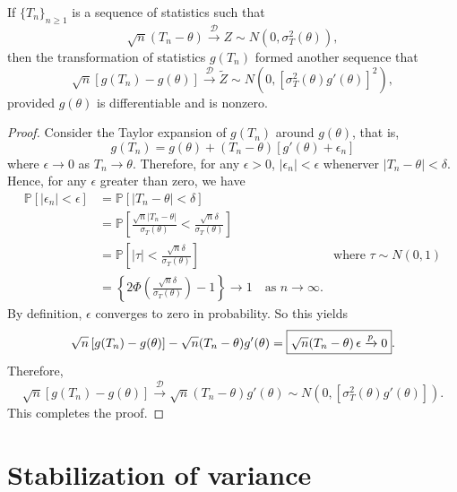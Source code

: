 \begin{lemma}
    \label{lem:las01}
    If $\{T_n\}_{n \geq 1}$ is a sequence of statistics such that 
    \begin{equation}
        \sqrt{n}(T_n - \theta) \xrightarrow[]{\mathcal{D}} Z \sim N\left(0, \sigma^2_T(\theta) \right),
    \end{equation}
    then the transformation of statistics $g(T_n)$ formed another sequence that
    \begin{equation}
        \sqrt{n}\left[ g(T_n) - g(\theta)\right] \xrightarrow[]{\mathcal{D}} \widetilde{Z} \sim N\left(0, \left[\sigma^2_T(\theta) g'(\theta) \right]^2 \right),
    \end{equation}
    provided $g(\theta)$ is differentiable and is nonzero.
\end{lemma}
\begin{proof}
    Consider the Taylor expansion of $g(T_n)$ around $g(\theta)$, that is,
    \[
        g(T_n) = g(\theta) + (T_n - \theta) [g'(\theta) + \epsilon_n]
    \]
    where $\epsilon \to 0$ as $T_n \to \theta$. Therefore, for any $\epsilon > 0$, $|\epsilon_n|<\epsilon$ whenerver 
    $|T_n - \theta| < \delta$. Hence, for any $\epsilon$ greater than zero, we have 
    \begin{align*}
        \mathbb{P} \left[ |\epsilon_n| < \epsilon\right] &= \mathbb{P} \left[ |T_n - \theta| < \delta \right]\\
        &= \mathbb{P} \left[ \frac{\sqrt{n} |T_n - \theta|}{\sigma_T(\theta)} < \frac{\sqrt{n} \delta}{\sigma_T(\theta)}\right]\\
        &= \mathbb{P} \left[ |\tau| < \frac{\sqrt{n} \delta}{\sigma_T(\theta)}\right] & \text{where } \tau \sim N(0,1)\\
        &= \left\{2 \Phi \left( \frac{\sqrt{n} \delta}{\sigma_T(\theta)}\right) - 1 \right\} \to 1 \quad \text{as } n \to \infty.
    \end{align*}
    By definition, $\epsilon$ converges to zero in probability. So this yields
    \[
        \sqrt{n}\left[ g(T_n) - g(\theta)\right] - \sqrt{n}(T_n - \theta)g'(\theta) = \fbox{$\sqrt{n}(T_n - \theta)\, \epsilon \xrightarrow[]{p} 0$}.
    \]
    Therefore, 
    \[
        \sqrt{n}\left[ g(T_n) - g(\theta)\right] \xrightarrow[]{\mathcal{D}} \sqrt{n}(T_n - \theta)g'(\theta) \sim N\left(0, \left[\sigma^2_T(\theta) g'(\theta) \right] \right).
    \]
    This completes the proof.
\end{proof}

\section{Stabilization of variance}

